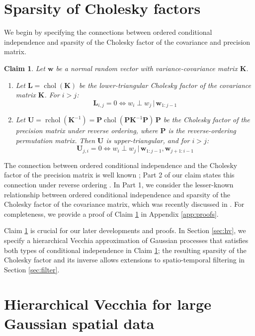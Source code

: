 \documentclass[12pt,letterpaper]{article}
\theoremstyle{propstyle}
\theoremstyle{propstyle}
\theoremstyle{propstyle}
\theoremstyle{propstyle}
\newtheorem{claim}{Claim}
\theoremstyle{propstyle}
\newcommand{\bw}{\mathbf{w}}
\newcommand{\bP}{\mathbf{P}}
\newcommand{\bL}{\mathbf{L}}
\newcommand{\bU}{\mathbf{U}}
\newcommand{\bK}{\mathbf{K}}
\DeclareMathOperator*{\rchol}{rchol}
\DeclareMathOperator*{\chol}{chol}
\begin{document}
\section{Sparsity of Cholesky factors\label{sec:sparsity}}

We begin by specifying the connections between ordered conditional independence and sparsity of the Cholesky factor of the covariance and precision matrix.
\begin{claim}
Let $\bw$ be a normal random vector with variance-covariance matrix $\bK$.
\begin{enumerate}
    \item Let $\bL = \chol(\bK)$ be the lower-triangular Cholesky factor of the covariance matrix $\bK$. For $i>j$:
    \[ \bL_{i,j}=0 \iff w_i \perp w_j \, | \, \bw_{1:j-1} \]
    \item Let $\bU = \rchol(\bK^{-1}) = \bP \chol( \bP\bK^{-1}\bP)\,\bP$ be the Cholesky factor of the precision matrix under reverse ordering, where $\bP$ is the reverse-ordering permutation matrix. Then $\bU$ is upper-triangular, and for $i>j$:
    \[ \bU_{j,i}=0 \iff w_i \perp w_j \, | \, \bw_{1:j-1},\bw_{j+1:i-1} \]
\end{enumerate}
\label{claim:cond-indep}
\end{claim}
The connection between ordered conditional independence and the Cholesky factor of the precision matrix is well known \citep[e.g.,][]{Rue2010}; Part 2 of our claim states this connection under reverse ordering \citep[e.g.,][Prop.~3.3]{Katzfuss2017a}. In Part 1, we consider the lesser-known relationship between ordered conditional independence and sparsity of the Cholesky factor of the covariance matrix, which was recently discussed in \citet[][Sect.~1.4.2]{Schafer2017}. For completeness, we provide a proof of Claim \ref{claim:cond-indep} in Appendix \ref{app:proofs}.

Claim \ref{claim:cond-indep} is crucial for our later developments and proofs. In Section \ref{sec:hv}, we specify a hierarchical Vecchia approximation of Gaussian processes that satisfies both types of conditional independence in Claim \ref{claim:cond-indep}; the resulting sparsity of the Cholesky factor and its inverse allows extensions to spatio-temporal filtering in Section \ref{sec:filter}.




\section{Hierarchical Vecchia for large Gaussian spatial data\label{sec:hv}}
\end{document}
